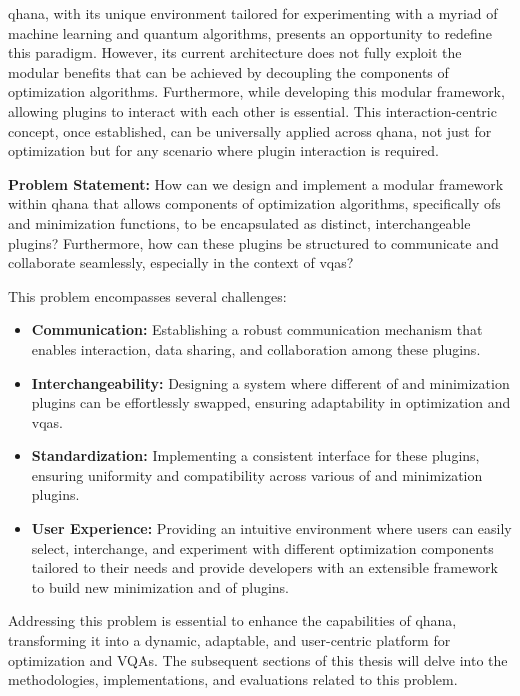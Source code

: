 \documentclass[
  a4paper,  %
  twoside,  %
  bibliography=totoc,
  headsepline,
  cleardoublepage=empty,
  parskip=half,
  draft=false
]{scrbook}
\begin{document}
\gls{qhana}, with its unique environment tailored for experimenting with a myriad of machine learning and quantum algorithms, presents an opportunity to redefine this paradigm.
However, its current architecture does not fully exploit the modular benefits that can be achieved by decoupling the components of optimization algorithms.
Furthermore, while developing this modular framework, allowing plugins to interact with each other is essential.
This interaction-centric concept, once established, can be universally applied across \gls{qhana}, not just for optimization but for any scenario where plugin interaction is required.

\textbf{Problem Statement:}
How can we design and implement a modular framework within \gls{qhana} that allows components of optimization algorithms, specifically \glspl{of} and minimization functions, to be encapsulated as distinct, interchangeable plugins?
Furthermore, how can these plugins be structured to communicate and collaborate seamlessly, especially in the context of \glspl{vqa}?

This problem encompasses several challenges:

\begin{itemize}
    \item \textbf{Communication:} Establishing a robust communication mechanism that enables interaction, data sharing, and collaboration among these plugins.
    \item \textbf{Interchangeability:} Designing a system where different \gls{of} and minimization plugins can be effortlessly swapped, ensuring adaptability in optimization and \glspl{vqa}.
    \item \textbf{Standardization:} Implementing a consistent interface for these plugins, ensuring uniformity and compatibility across various \gls{of} and minimization plugins.
    \item \textbf{User Experience:} Providing an intuitive environment where users can easily select, interchange, and experiment with different optimization components tailored to their needs and provide developers with an extensible framework to build new minimization and \gls{of} plugins.
\end{itemize}

Addressing this problem is essential to enhance the capabilities of \gls{qhana}, transforming it into a dynamic, adaptable, and user-centric platform for optimization and VQAs.
The subsequent sections of this thesis will delve into the methodologies, implementations, and evaluations related to this problem.
\end{document}
